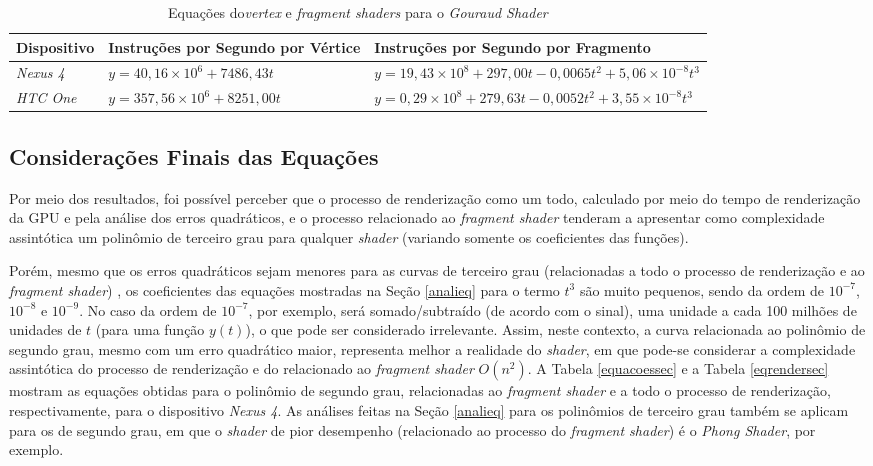 	\begin{table}[ht]
	\centering	
	\begin{tabularx}{0.9\textwidth}{lXX}
		\toprule
		\textbf{Dispositivo} & \textbf{Instruções por Segundo por Vértice} & \textbf{Instruções por Segundo por Fragmento}  \\
		\midrule
		\textit{Nexus 4} & $y = 40,16 \times 10^6 + 7486,43t$ & $y = 19,43 \times 10 ^8 + 297,00t - 0,0065t^2 + 5,06 \times 10^{-8}t^3 $  \\
		\textit{HTC One} & $y = 357,56 \times 10^6 + 8251,00t$ & $y = 0,29 \times 10 ^8 + 279,63t - 0,0052t^2 + 3,55 \times 10^{-8}t^3 $  \\

		\bottomrule
	\end{tabularx}
	\caption{Equações do\textit{vertex} e \textit{fragment shaders} para o \textit{Gouraud Shader}}
	\label{vertex_frag_comp}
	\end{table}

\subsection{Considerações Finais das Equações}

	Por meio dos resultados, foi possível perceber que o processo de renderização como um todo, calculado por meio do tempo de renderização da GPU e pela análise dos erros quadráticos, e o processo relacionado ao \textit{fragment shader} tenderam a apresentar como complexidade assintótica um polinômio de terceiro grau para qualquer \textit{shader} (variando somente os coeficientes das funções).

	 Porém, mesmo que os erros quadráticos sejam menores para as curvas de terceiro grau (relacionadas a todo o processo de renderização e ao \textit{fragment shader}) , os coeficientes das equações mostradas na Seção \ref{analieq} para o termo $t^3$ são muito pequenos, sendo da ordem de  $10^{-7}$, $10^{-8}$ e $10^{-9}$.  No caso da ordem de $10^{-7}$, por exemplo, será somado/subtraído (de acordo com o sinal), uma unidade a cada 100 milhões de unidades de $t$ (para uma função $y(t)$), o que pode ser considerado irrelevante. Assim, neste contexto, a curva relacionada ao polinômio de segundo grau, mesmo com um erro quadrático maior, representa melhor a realidade do \textit{shader}, em que pode-se considerar a complexidade assintótica do processo de renderização e do relacionado ao \textit{fragment shader} $O(n^2)$. A Tabela \ref{equacoessec} e a Tabela \ref{eqrendersec} mostram as equações obtidas para o polinômio de segundo grau, relacionadas ao \textit{fragment shader} e a todo o processo de renderização, respectivamente, para o dispositivo \textit{Nexus 4}. As análises feitas na Seção \ref{analieq} para os polinômios de terceiro grau também se aplicam para os de segundo grau, em que o \textit{shader} de pior desempenho (relacionado ao processo do \textit{fragment shader}) é o \textit{Phong Shader}, por exemplo. 

